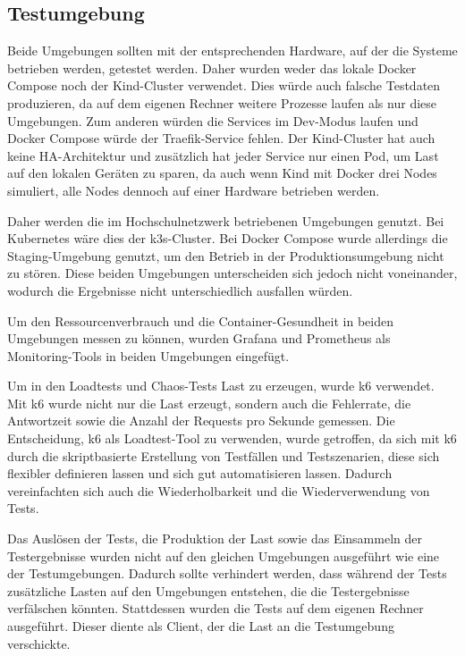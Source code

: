 \subsection{Testumgebung}
Beide Umgebungen sollten mit der entsprechenden Hardware, auf der die Systeme betrieben werden, getestet werden.
Daher wurden weder das lokale Docker Compose noch der Kind-Cluster verwendet. 
Dies würde auch falsche Testdaten produzieren, da auf dem eigenen Rechner weitere Prozesse laufen als nur diese Umgebungen.
Zum anderen würden die Services im Dev-Modus laufen und Docker Compose würde der Traefik-Service fehlen. 
Der Kind-Cluster hat auch keine HA-Architektur und zusätzlich hat jeder Service nur einen Pod, um Last auf den lokalen Geräten zu sparen, da auch wenn Kind mit Docker drei Nodes simuliert, alle Nodes dennoch auf einer Hardware betrieben werden.

Daher werden die im Hochschulnetzwerk betriebenen Umgebungen genutzt. Bei Kubernetes wäre dies der k3s-Cluster.
Bei Docker Compose wurde allerdings die Staging-Umgebung genutzt, um den Betrieb in der Produktionsumgebung nicht zu stören.
Diese beiden Umgebungen unterscheiden sich jedoch nicht voneinander, wodurch die Ergebnisse nicht unterschiedlich ausfallen würden.

Um den Ressourcenverbrauch und die Container-Gesundheit in beiden Umgebungen messen zu können, wurden Grafana und Prometheus als Monitoring-Tools in beiden Umgebungen eingefügt.

Um in den Loadtests und Chaos-Tests Last zu erzeugen, wurde k6 verwendet. 
Mit k6 wurde nicht nur die Last erzeugt, sondern auch die Fehlerrate, die Antwortzeit sowie die Anzahl der Requests pro Sekunde gemessen.
Die Entscheidung, k6 als Loadtest-Tool zu verwenden, wurde getroffen, da sich mit k6 durch die skriptbasierte Erstellung von Testfällen und Testszenarien, diese sich flexibler definieren lassen und sich gut automatisieren lassen. 
Dadurch vereinfachten sich auch die Wiederholbarkeit und die Wiederverwendung von Tests.

Das Auslösen der Tests, die Produktion der Last sowie das Einsammeln der Testergebnisse wurden nicht auf den gleichen Umgebungen ausgeführt wie eine der Testumgebungen.
Dadurch sollte verhindert werden, dass während der Tests zusätzliche Lasten auf den Umgebungen entstehen, die die Testergebnisse verfälschen könnten.
Stattdessen wurden die Tests auf dem eigenen Rechner ausgeführt. Dieser diente als Client, der die Last an die Testumgebung verschickte.

